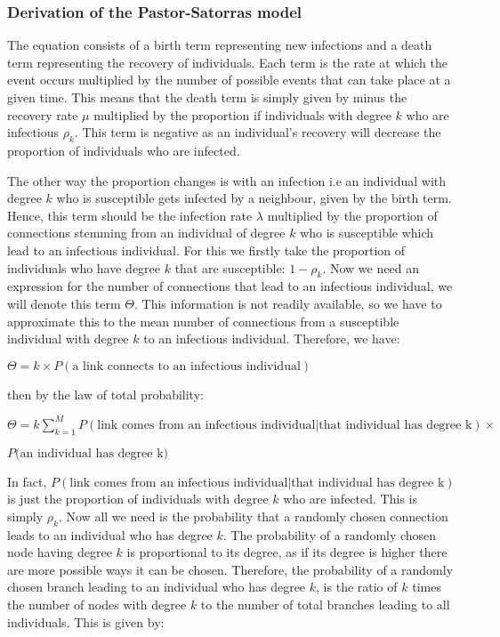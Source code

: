 \documentclass{uonmathsreport}
\begin{document}
\subsubsection{Derivation of the Pastor-Satorras model} \label{subsubsec:6.1.2}
\indent
The equation consists of a birth term representing new infections and a death term representing the recovery of individuals. Each term is the rate at which the event occurs multiplied by the number of possible events that can take place at a given time. This means that the death term is simply given by minus the recovery rate $\mu$ multiplied by the proportion if individuals with degree $k$ who are infectious $\rho_k$. This term is negative as an individual's recovery will decrease the proportion of individuals who are infected.

The other way the proportion changes is with an infection i.e an individual with degree $k$ who is susceptible gets infected by a neighbour, given by the birth term. Hence, this term should be the infection rate $\lambda$ multiplied by the proportion of connections stemming from an individual of degree $k$ who is susceptible which lead to an infectious individual. For this we firstly take the proportion of individuals who have degree $k$ that are susceptible: $1-\rho_k$. Now we need an expression for the number of connections that lead to an infectious individual, we will denote this term $\Theta$. This information is not readily available, so we have to approximate this to the mean number of connections from a susceptible individual with degree $k$ to an infectious individual. Therefore, we have:
\bigskip

$\Theta = k \times P(\mbox{a link connects to an infectious individual})$
\bigskip

\noindent
then by the law of total probability:
\bigskip


$\Theta = k  \sum_{k=1}^{M} P(\mbox{link comes from an infectious individual} \vert \mbox{that individual has degree k})\times$

$P\mbox{(an individual has degree k)}$
\bigskip

\par
In fact, $P(\mbox{link comes from an infectious individual} \vert \mbox{that individual has degree k})$ is just the proportion of individuals with degree $k$ who are infected. This is simply $\rho_k$. Now all we need is the probability that a randomly chosen connection leads to an individual who has degree $k$. The probability of a randomly chosen node having degree $k$ is proportional to its degree, as if its degree is higher there are more possible ways it can be chosen. Therefore, the probability of a randomly chosen branch leading to an individual who has degree $k$, is the ratio of $k$ times the number of nodes with degree $k$ to the number of total branches leading to all individuals. This is given by:
\end{document}
